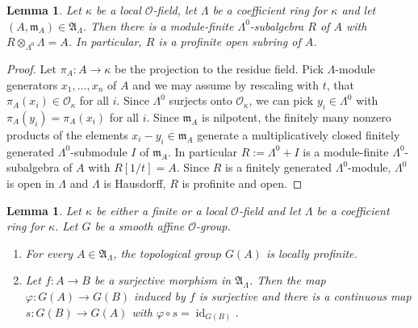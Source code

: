 \documentclass{amsart}
\newtheorem{lem}[prop]{Lemma}
\theoremstyle{definition}
\theoremstyle{remark}
\DeclareMathOperator{\id}{id}
\newcommand{\mm}{\mathfrak m}
\newcommand{\OO}{\mathcal O}
\begin{document}
\begin{lem}\label{cptopensubalg} Let $\kappa$ be  a local $\OO$-field, let $\Lambda$ be a coefficient ring for $\kappa$ and let $(A, \mm_A) \in \mathfrak A_{\Lambda}$. Then there is a module-finite $\Lambda^0$-subalgebra $R$ of $A$ with $R \otimes_{\Lambda^0} \Lambda = A$. In particular, $R$ is a profinite open subring of $A$.
\end{lem}


\begin{proof}
Let $\pi_A : A \to \kappa$ be the projection to the residue field.
Pick $\Lambda$-module generators $x_1, \dots, x_n$ of $A$ and we may assume by rescaling with $t$, that $\pi_A(x_i) \in \OO_{\kappa}$ for all $i$.
Since $\Lambda^0$ surjects onto $\OO_{\kappa}$, we can pick $y_i \in \Lambda^0$ with $\pi_A(y_i) = \pi_A(x_i)$ for all $i$.
Since $\mm_A$ is nilpotent, the finitely many nonzero products of the elements $x_i - y_i \in \mm_A$ generate a multiplicatively closed finitely generated $\Lambda^0$-submodule $I$ of $\mm_A$.
In particular $R := \Lambda^0 + I$ is a module-finite
$\Lambda^0$-subalgebra of $A$ with $R[1/t] = A$.
Since $R$ is a finitely generated $\Lambda^0$-module, $\Lambda^0$ is open in $\Lambda$ and $\Lambda$ is Hausdorff, $R$ is profinite and open.
\end{proof}

\begin{lem}\label{splittingexists} Let $\kappa$ be either a finite or a local $\OO$-field and let $\Lambda$ be a coefficient ring for $\kappa$. Let $G$ be a smooth affine $\OO$-group.
\begin{enumerate}
    \item For every $A \in \mathfrak A_{\Lambda}$, the topological group $G(A)$ is locally profinite.
    \item Let $f : A \to B$ be a surjective morphism in $\mathfrak A_{\Lambda}$. Then the map $\varphi : G(A) \to G(B)$ induced by $f$ is surjective and there is a continuous map $s : G(B) \to G(A)$ with $\varphi \circ s = \id_{G(B)}$.
\end{enumerate}
\end{lem}
\end{document}
